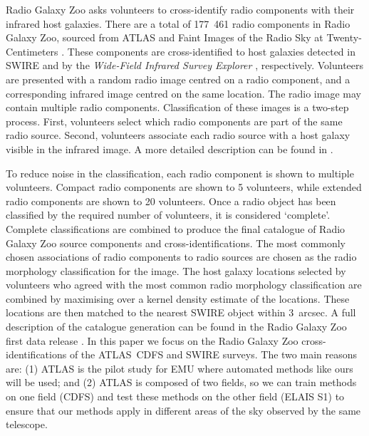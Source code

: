 \documentclass[fleqn,usenatbib,usedcolumn]{mnras}
\begin{document}
    Radio Galaxy Zoo asks volunteers to cross-identify radio components with
    their infrared host galaxies. There are a total of 177~461 radio components
    in Radio Galaxy Zoo, sourced from ATLAS and Faint Images of the Radio Sky at
    Twenty-Centimeters \citep[FIRST;][]{white97first}. These components are
    cross-identified to host galaxies detected in SWIRE and by the
    \emph{Wide-Field Infrared Survey Explorer} \citep[WISE;][]{wright10wise},
    respectively.  Volunteers are presented with a random radio image centred on a radio
    component, and a corresponding infrared image centred on the same
    location. The radio image may contain multiple radio components.
    Classification of these images is a two-step process. First, volunteers
    select which radio components are part of the same radio source. Second,
    volunteers associate each radio source with a host galaxy visible in the
    infrared image. A more detailed description can be found in
    \citet{banfield15}.

    To reduce noise in the classification, each radio component is shown to
    multiple volunteers. Compact radio components are shown to 5 volunteers,
    while extended radio components are shown to 20 volunteers. Once a radio
    object has been classified by the required number of volunteers, it is
    considered `complete'. Complete classifications are combined to produce
    the final catalogue of Radio Galaxy Zoo source components and
    cross-identifications. The most commonly chosen associations of radio
    components to radio sources are chosen as the radio morphology
    classification for the image. The host galaxy locations selected by
    volunteers who agreed with the most common radio morphology classification
    are combined by maximising over a kernel density estimate of the locations.
    These locations are then matched to the nearest SWIRE object within
    3~arcsec. A full description of the catalogue generation can be found in the Radio Galaxy Zoo first data release
    \citep{wong17}. %
    In this paper we focus on the Radio Galaxy Zoo cross-identifications of
    the ATLAS~CDFS and SWIRE surveys. The two main reasons are: (1) ATLAS is the pilot study for EMU where automated methods
    like ours will be used; and (2) ATLAS is composed of two
    fields, so we can train methods on one field (CDFS) and test these methods on
    the other field (ELAIS S1) to ensure that our methods apply in different areas of
    the sky observed by the same telescope.
\end{document}
